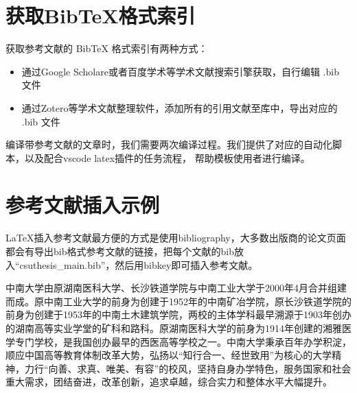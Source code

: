 \section{获取BibTeX格式索引}

获取参考文献的 BibTeX 格式索引有两种方式：

\begin{itemize}
    \item 通过Google Scholare或者百度学术等学术文献搜索引擎获取，自行编辑 .bib 文件
    \item 通过Zotero等学术文献整理软件，添加所有的引用文献至库中，导出对应的 .bib 文件
\end{itemize}

编译带参考文献的文章时，我们需要两次编译过程。我们提供了对应的自动化脚本，以及配合vscode latex插件的任务流程，
帮助模板使用者进行编译。

\section{参考文献插入示例}

LaTeX\cite{lamport1994latex}插入参考文献最方便的方式是使用bibliography\cite{pritchard1969statistical}，大多数出版商的论文页面\cite{lamport1994latex,pritchard1969statistical}都会有导出bib格式参考文献的链接，把每个文献的bib放入``csuthesis\_main.bib''，然后用bibkey即可插入参考文献。

中南大学由原湖南医科大学、长沙铁道学院与中南工业大学于2000年4月合并组建而成。原中南工业大学的前身为创建于1952年的中南矿冶学院，原长沙铁道学院的前身为创建于1953年的中南土木建筑学院，两校的主体学科最早溯源于1903年创办的湖南高等实业学堂的矿科和路科。原湖南医科大学的前身为1914年创建的湘雅医学专门学校，是我国创办最早的西医高等学校之一。中南大学秉承百年办学积淀，顺应中国高等教育体制改革大势，弘扬以“知行合一、经世致用”为核心的大学精神，力行“向善、求真、唯美、有容”的校风，坚持自身办学特色，服务国家和社会重大需求，团结奋进，改革创新，追求卓越，综合实力和整体水平大幅提升。




